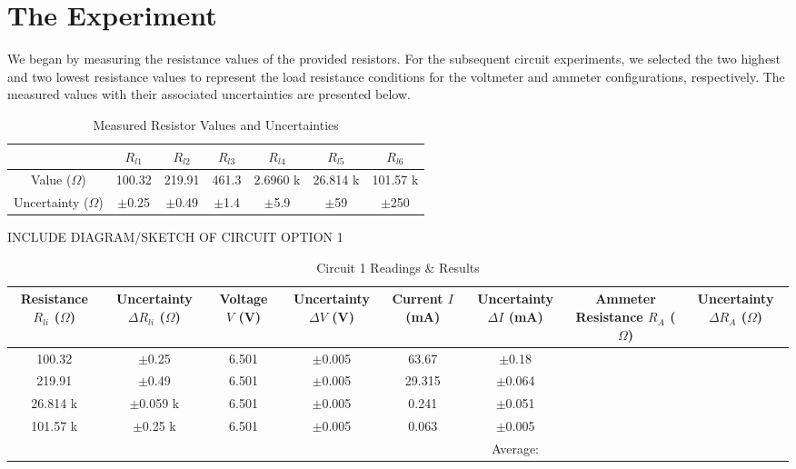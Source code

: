 \documentclass{article} %
\begin{document}
\section{The Experiment}

We began by measuring the resistance values of the provided resistors. 
For the subsequent circuit experiments, we selected the two highest and two lowest resistance values to represent the load resistance conditions for the voltmeter and ammeter configurations, respectively. 
The measured values with their associated uncertainties are presented below.

\label{table_resistor_values}
\begin{table}[htbp]
\centering
\caption{Measured Resistor Values and Uncertainties}
\begin{tabular}{|c|c|c|c|c|c|c|}
\hline
 & $R_{l1}$ & $R_{l2}$ & $R_{l3}$ & $R_{l4}$ & $R_{l5}$ & $R_{l6}$ \\
\hline
Value ($\Omega$) & 100.32 & 219.91 & 461.3 & 2.6960 k & 26.814 k & 101.57 k \\
\hline
Uncertainty ($\Omega$) & $\pm$0.25 & $\pm$0.49 & $\pm$1.4 & $\pm$5.9 & $\pm$59 & $\pm$250 \\
\hline
\end{tabular}
\end{table}

INCLUDE DIAGRAM/SKETCH OF CIRCUIT OPTION 1

\begin{table}[htbp]
\centering
\caption{Circuit 1 Readings \& Results}
\begin{tabular}{|c|c|c|c|c|c|c|c|}
\hline
\makecell{Resistance \\ $R_{li}$ ($\Omega$)} & \makecell{Uncertainty \\ $\Delta R_{li}$ ($\Omega$)} & \makecell{Voltage \\ $V$ (V)} & \makecell{Uncertainty \\ $\Delta V$ (V)} & \makecell{Current \\ $I$ (mA)} & \makecell{Uncertainty \\ $\Delta I$ (mA)} & \makecell{Ammeter Resistance \\ $R_A$ ($\Omega$)} & \makecell{Uncertainty \\ $\Delta R_A$ ($\Omega$)} \\
\hline
100.32 & $\pm$0.25 & 6.501 & $\pm$0.005 & 63.67 & $\pm$0.18 & & \\
\hline
219.91 & $\pm$0.49 & 6.501 & $\pm$0.005 & 29.315 & $\pm$0.064 & & \\
\hline
26.814 k & $\pm$0.059 k & 6.501 & $\pm$0.005 & 0.241 & $\pm$0.051 & & \\
\hline
101.57 k & $\pm$0.25 k & 6.501 & $\pm$0.005 & 0.063 & $\pm$0.005 & & \\
\hline
\cellcolor{gray!50} & \cellcolor{gray!50} & \cellcolor{gray!50} & \cellcolor{gray!50} & \cellcolor{gray!50} & Average: &  &  \\
\hline
\end{tabular}
\end{table}
\end{document}
